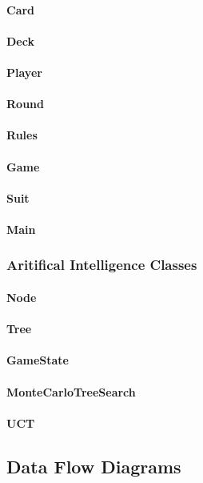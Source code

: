 \paragraph{Card}
\paragraph{Deck}
\paragraph{Player}
\paragraph{Round}
\paragraph{Rules}
\paragraph{Game}
\paragraph{Suit}
\paragraph{Main}
\subsubsection{Aritifical Intelligence Classes}
\paragraph{Node}
\paragraph{Tree}
\paragraph{GameState}
\paragraph{MonteCarloTreeSearch}
\paragraph{UCT}
\subsection{Data Flow Diagrams}

